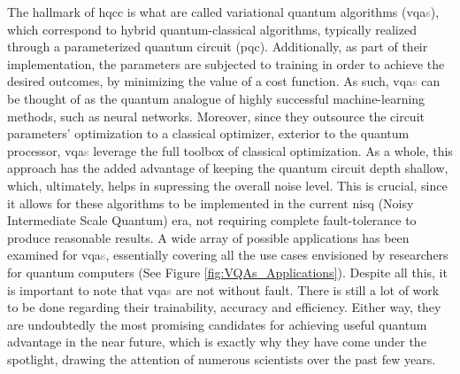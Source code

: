


The hallmark of \acrshort{hqcc} is what are called variational quantum algorithms (\acrshort{vqa}\textcolor{gray}{s}), which correspond to hybrid quantum-classical algorithms, typically realized through a parameterized quantum circuit (\acrshort{pqc}). Additionally, as part of their implementation, the parameters are subjected to training in order to achieve the desired outcomes, by minimizing the value of a cost function. As such, \acrshort{vqa}\textcolor{gray}{s} can be thought of as the quantum analogue of highly successful machine-learning methods, such as neural networks. Moreover, since they outsource the circuit parameters' optimization to a classical optimizer, exterior to the quantum processor, \acrshort{vqa}\textcolor{gray}{s} leverage the full toolbox of classical optimization. As a whole, this approach has the added advantage of keeping the quantum circuit depth shallow, which, ultimately, helps in supressing the overall noise level. This is crucial, since it allows for these algorithms to be implemented in the current \acrshort{nisq} (Noisy Intermediate Scale Quantum) era, not requiring complete fault-tolerance to produce reasonable results. A wide array of possible applications has been examined for \acrshort{vqa}\textcolor{gray}{s}, essentially covering all the use cases envisioned by researchers for quantum computers (See Figure \ref{fig:VQAs_Applications}). Despite all this, it is important to note that \acrshort{vqa}\textcolor{gray}{s} are not without fault. There is still a lot of work to be done regarding their trainability, accuracy and efficiency. Either way, they are undoubtedly the most promising candidates for achieving useful quantum advantage in the near future, which is exactly why they have come under the spotlight, drawing the attention of numerous scientists over the past few years.

